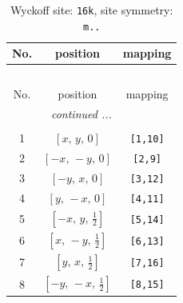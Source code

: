 \documentclass[fleqn,8pt]{jsarticle}
\begin{document}
\begin{longtable}{ccc}
\caption{Wyckoff site: {\tt 16k}, site symmetry: {\tt m..}}
 \\
 \hline \hline
No. & position & mapping \\ \hline \endfirsthead

\multicolumn{2}{l}{\tablename\ \thetable{}} \\
 \hline \hline
No. & position & mapping \\ \hline \endhead

 \hline \hline
\multicolumn{2}{r}{\footnotesize\it continued ...} \\ \endfoot

 \hline \hline
\multicolumn{2}{r}{} \\ \endlastfoot

1 & $\left[ x,\, y,\, 0 \right]$ & {\tt [1,10]} \\ \hline
2 & $\left[ - x,\, - y,\, 0 \right]$ & {\tt [2,9]} \\ \hline
3 & $\left[ - y,\, x,\, 0 \right]$ & {\tt [3,12]} \\ \hline
4 & $\left[ y,\, - x,\, 0 \right]$ & {\tt [4,11]} \\ \hline
5 & $\left[ - x,\, y,\, \frac{1}{2} \right]$ & {\tt [5,14]} \\ \hline
6 & $\left[ x,\, - y,\, \frac{1}{2} \right]$ & {\tt [6,13]} \\ \hline
7 & $\left[ y,\, x,\, \frac{1}{2} \right]$ & {\tt [7,16]} \\ \hline
8 & $\left[ - y,\, - x,\, \frac{1}{2} \right]$ & {\tt [8,15]} \\
\end{longtable}
\renewcommand{\arraystretch}{1.2}
\end{document}
